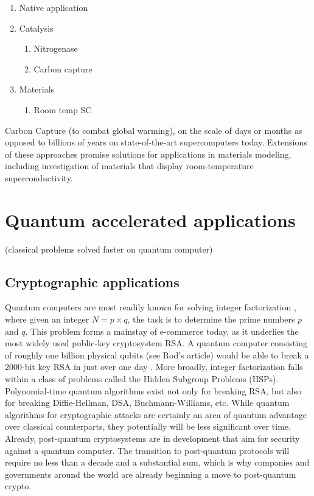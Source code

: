 \documentclass[journal]{IEEEtran}
\begin{document}
\begin{enumerate}
\item      Native application
\item     Catalysis
\begin{enumerate}
                               \item         Nitrogenase
                           \item        Carbon capture
\end{enumerate}
\item      Materials
 \begin{enumerate}
                           \item         Room temp SC
\end{enumerate}
\end{enumerate}


 Carbon Capture (to combat global warming), on the scale of days or months as opposed to billions of years on state-of-the-art supercomputers today.  Extensions of these approaches promise solutions for applications in materials modeling, including investigation of materials that display room-temperature superconductivity. 




\section{Quantum accelerated applications}
 (classical problems solved faster on quantum computer)
\subsection{Cryptographic applications}
Quantum computers are most readily known for solving integer factorization \cite{}, where given an integer $N=p\times q$, the task is to determine the prime numbers $p$ and $q$.  This problem forms a mainstay of e-commerce today, as it underlies the most widely used public-key cryptosystem RSA.  A quantum computer consisting of roughly one billion physical qubits (see Rod's article) would be able to break a 2000-bit key RSA in just over one day \cite{}.  More broadly, integer factorization falls within a class of problems called the Hidden Subgroup Problems (HSPs).  Polynomial-time quantum algorithms exist not only for breaking RSA, but also for breaking Diffie-Hellman, DSA, Buchmann-Williams, etc.
While quantum algorithms for cryptographic attacks are certainly an area of quantum advantage over classical counterparts, they potentially will be less significant over time.  Already, post-quantum cryptosystems are in development that aim for security against a quantum computer.  The transition to post-quantum protocols will require no less than a decade and a substantial sum, which is why companies and governments around the world are already beginning a move to post-quantum crypto.  
\end{document}
